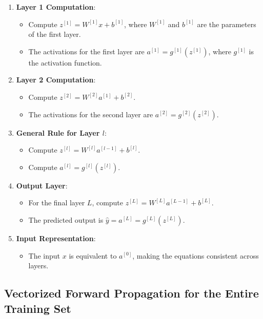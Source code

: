 \documentclass[letterpaper,12pt,notitlepage,twoside]{report}
\begin{document}
\begin{enumerate}
    \item \textbf{Layer 1 Computation}:
    \begin{itemize}
        \item Compute \( z^{[1]} = W^{[1]} x + b^{[1]} \), where \( W^{[1]} \) and \( b^{[1]} \) are the parameters of the first layer.
        \item The activations for the first layer are \( a^{[1]} = g^{[1]}(z^{[1]}) \), where \( g^{[1]} \) is the activation function.
    \end{itemize}
    
    \item \textbf{Layer 2 Computation}:
    \begin{itemize}
        \item Compute \( z^{[2]} = W^{[2]} a^{[1]} + b^{[2]} \).
        \item The activations for the second layer are \( a^{[2]} = g^{[2]}(z^{[2]}) \).
    \end{itemize}
    
    \item \textbf{General Rule for Layer \( l \)}:
    \begin{itemize}
        \item Compute \( z^{[l]} = W^{[l]} a^{[l-1]} + b^{[l]} \).
        \item Compute \( a^{[l]} = g^{[l]}(z^{[l]}) \).
    \end{itemize}
    
    \item \textbf{Output Layer}:
    \begin{itemize}
        \item For the final layer \( L \), compute \( z^{[L]} = W^{[L]} a^{[L-1]} + b^{[L]} \).
        \item The predicted output is \( \hat{y} = a^{[L]} = g^{[L]}(z^{[L]}) \).
    \end{itemize}
    
    \item \textbf{Input Representation}:
    \begin{itemize}
        \item The input \( x \) is equivalent to \( a^{[0]} \), making the equations consistent across layers.
    \end{itemize}
\end{enumerate}

\subsection*{Vectorized Forward Propagation for the Entire Training Set}
\end{document}
